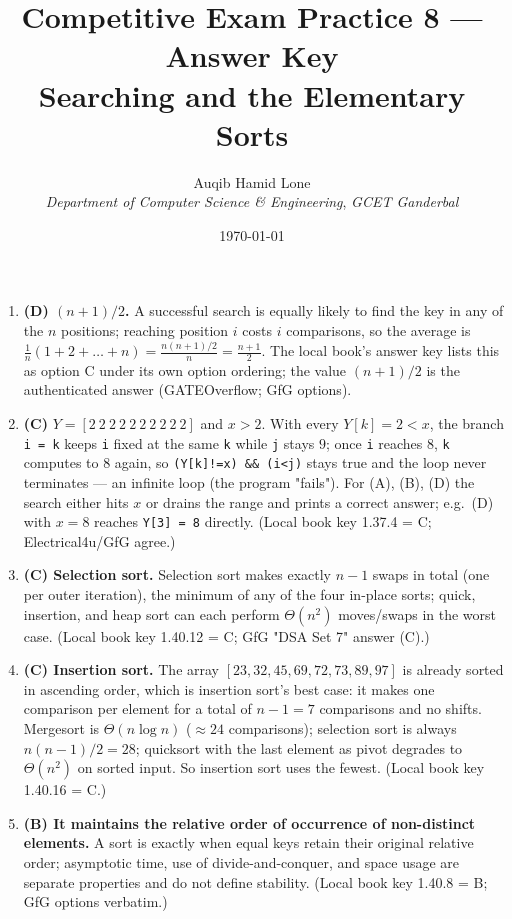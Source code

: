 \documentclass[11pt]{article}
\title{Competitive Exam Practice 8 --- Answer Key\\\large Searching and the Elementary Sorts}
\author{Auqib Hamid Lone\\[0.3em]
  \emph{Department of Computer Science \& Engineering}, \emph{GCET Ganderbal}}
\date{\today}
\begin{document}
\maketitle

\begin{enumerate}
\item[\textbf{Q1}] \textbf{(D) $(n+1)/2$.} A successful search is equally likely to find the key in any of the $n$ positions; reaching position $i$ costs $i$ comparisons, so the average is $\frac{1}{n}(1+2+\dots+n) = \frac{n(n+1)/2}{n} = \frac{n+1}{2}$. The local book's answer key lists this as option C under its own option ordering; the value $(n+1)/2$ is the authenticated answer (GATEOverflow; GfG options).

\item[\textbf{Q2}] \textbf{(C)} $Y = [2\ 2\ 2\ 2\ 2\ 2\ 2\ 2\ 2\ 2]$ and $x > 2$. With every $Y[k]=2<x$, the branch \texttt{i = k} keeps \texttt{i} fixed at the same \texttt{k} while \texttt{j} stays $9$; once \texttt{i} reaches $8$, \texttt{k} computes to $8$ again, so \texttt{(Y[k]!=x) \&\& (i<j)} stays true and the loop never terminates --- an infinite loop (the program "fails"). For (A), (B), (D) the search either hits $x$ or drains the range and prints a correct answer; e.g.\ (D) with $x=8$ reaches \texttt{Y[3] = 8} directly. (Local book key 1.37.4 = C; Electrical4u/GfG agree.)

\item[\textbf{Q3}] \textbf{(C) Selection sort.} Selection sort makes exactly $n-1$ swaps in total (one per outer iteration), the minimum of any of the four in-place sorts; quick, insertion, and heap sort can each perform $\Theta(n^2)$ moves/swaps in the worst case. (Local book key 1.40.12 = C; GfG "DSA Set 7" answer (C).)

\item[\textbf{Q4}] \textbf{(C) Insertion sort.} The array $[23,32,45,69,72,73,89,97]$ is already sorted in ascending order, which is insertion sort's best case: it makes one comparison per element for a total of $n-1 = 7$ comparisons and no shifts. Mergesort is $\Theta(n\log n)$ ($\approx 24$ comparisons); selection sort is always $n(n-1)/2 = 28$; quicksort with the last element as pivot degrades to $\Theta(n^2)$ on sorted input. So insertion sort uses the fewest. (Local book key 1.40.16 = C.)

\item[\textbf{Q5}] \textbf{(B) It maintains the relative order of occurrence of non-distinct elements.} A sort is  exactly when equal keys retain their original relative order; asymptotic time, use of divide-and-conquer, and space usage are separate properties and do not define stability. (Local book key 1.40.8 = B; GfG options verbatim.)


\end{enumerate}
\end{document}
